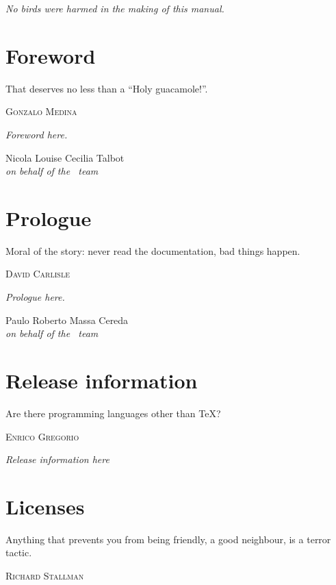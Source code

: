 \documentclass[a4paper,twoside,12pt]{memoir}
\begin{document}
\cleardoublepage

\vspace*{25em}

\begin{flushright}
\em No birds were harmed in the making of this manual.
\end{flushright}

\chapter*{Foreword}
\label{chap:foreword}

\epigraph{That deserves no less than a ``Holy guacamole!''.}{\textsc{Gonzalo Medina}}

\emph{Foreword here.}

\vfill

\begin{flushright}
Nicola Louise Cecilia Talbot\\
\emph{on behalf of the \arara\ team}
\end{flushright}

\chapter*{Prologue}
\label{chap:prologue}

\epigraph{Moral of the story: never read the documentation, bad things happen.}{\textsc{David Carlisle}}

\emph{Prologue here.}

\vfill

\begin{flushright}
Paulo Roberto Massa Cereda\\
\emph{on behalf of the \arara\ team}
\end{flushright}

\chapter*{Release information}
\label{chap:releaseinformation}

\epigraph{Are there programming languages other than \TeX?}{\textsc{Enrico Gregorio}}

\emph{Release information here}

\chapter*{Licenses}
\label{chap:licenses}

\epigraph{Anything that prevents you from being friendly, a good neighbour, is a terror tactic.}{\textsc{Richard Stallman}}
\end{document}

